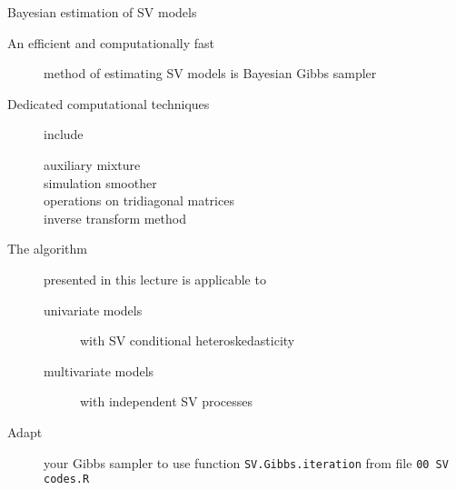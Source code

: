 \documentclass[notes,blackandwhite,mathsans,usenames,dvipsnames]{beamer}
\begin{document}
{
\begin{frame}{Bayesian estimation of SV models}

\begin{description}
\item[\color{mcxs5}An efficient and computationally fast] {\color{mcxs3}method of estimating SV models is Bayesian Gibbs sampler}
\bigskip\item[\color{mcxs5}Dedicated computational techniques] {\color{mcxs3}include}
	\begin{description}
	\item[\color{mcxs5}auxiliary mixture]
	\item[\color{mcxs5}simulation smoother]
	\item[\color{mcxs5}operations on tridiagonal matrices]
	\item[\color{mcxs5}inverse transform method]
	\end{description}

\bigskip\item[\color{mcxs5}The algorithm] {\color{mcxs3}presented in this lecture is applicable to}
	\begin{description}
	\item[\color{mcxs5}univariate models] {\color{mcxs3}with SV conditional heteroskedasticity}
	\item[\color{mcxs5}multivariate models] {\color{mcxs3}with independent SV processes}
	\end{description}

\bigskip\item[\color{mcxs5}Adapt] {\color{mcxs3}your Gibbs sampler to use function} \texttt{\color{mcxs5}SV.Gibbs.iteration} {\color{mcxs3}from file} \texttt{\color{mcxs5}00 SV codes.R}
\end{description}

\end{frame}
}
\end{document}
